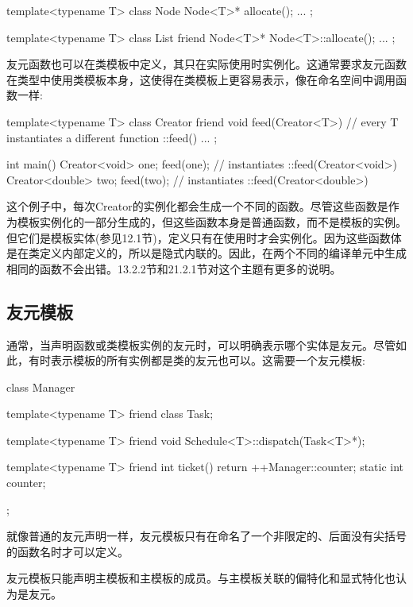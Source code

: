\begin{cpp}
template<typename T>
class Node {
	Node<T>* allocate();
	...
};

template<typename T>
class List {
	friend Node<T>* Node<T>::allocate();
	...
};
\end{cpp}

友元函数也可以在类模板中定义，其只在实际使用时实例化。这通常要求友元函数在类型中使用类模板本身，这使得在类模板上更容易表示，像在命名空间中调用函数一样:

\begin{cpp}
template<typename T>
class Creator {
	friend void feed(Creator<T>) { // every T instantiates a different function ::feed()
		...
	}
};

int main()
{
	Creator<void> one;
	feed(one); // instantiates ::feed(Creator<void>)
	Creator<double> two;
	feed(two); // instantiates ::feed(Creator<double>)
}
\end{cpp}

这个例子中，每次Creator的实例化都会生成一个不同的函数。尽管这些函数是作为模板实例化的一部分生成的，但这些函数本身是普通函数，而不是模板的实例。但它们是模板实体(参见12.1节)，定义只有在使用时才会实例化。因为这些函数体是在类定义内部定义的，所以是隐式内联的。因此，在两个不同的编译单元中生成相同的函数不会出错。13.2.2节和21.2.1节对这个主题有更多的说明。

\subsection{友元模板}

通常，当声明函数或类模板实例的友元时，可以明确表示哪个实体是友元。尽管如此，有时表示模板的所有实例都是类的友元也可以。这需要一个友元模板:

\begin{cpp}
class Manager {
	template<typename T>
	friend class Task;
	
	template<typename T>
	friend void Schedule<T>::dispatch(Task<T>*);
	
	template<typename T>
		friend int ticket() {
			return ++Manager::counter;
		}
	static int counter;
};
\end{cpp}

就像普通的友元声明一样，友元模板只有在命名了一个非限定的、后面没有尖括号的函数名时才可以定义。

友元模板只能声明主模板和主模板的成员。与主模板关联的偏特化和显式特化也认为是友元。








